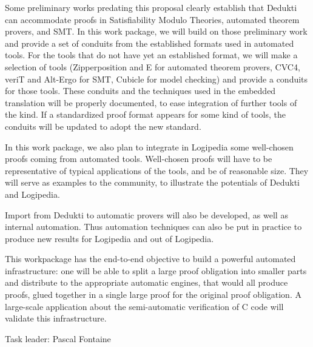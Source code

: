 \begin{workpackage}
\begin{wpdescription}
Some preliminary works predating this proposal clearly establish that
Dedukti can accommodate proofs in Satisfiability Modulo Theories,
automated theorem provers, and SMT.  In this work package, we will
build on those preliminary work and provide a set of conduits from the
established formats used in automated tools. For the tools that do not
have yet an established format, we will make a selection of tools
(Zipperposition and E for automated theorem provers, CVC4, veriT and Alt-Ergo
for SMT, Cubicle for model checking) and provide a conduits for those
tools.  These conduits and the techniques used in the embedded
translation will be properly documented, to ease integration of
further tools of the kind.  If a standardized proof format appears for
some kind of tools, the conduits will be updated to adopt the new
standard.

In this work package, we also plan to integrate in Logipedia some
well-chosen proofs coming from automated tools.  Well-chosen proofs
will have to be representative of typical applications of the tools,
and be of reasonable size.  They will serve as examples to the
community, to illustrate the potentials of Dedukti and Logipedia.

Import from Dedukti to automatic provers will also be developed, as well
as internal automation. Thus automation techniques can also be put in
practice to produce new results for Logipedia and out of Logipedia.

This workpackage has the end-to-end objective to build a powerful
automated infrastructure: one will be able to split a large proof
obligation into smaller parts and distribute to the appropriate
automatic engines, that would all produce proofs, glued together in a
single large proof for the original proof obligation. A large-scale
application about the semi-automatic verification of C code will
validate this infrastructure.
\end{wpdescription}


\begin{tasklist}
\begin{task}[id=instrumenting, title=Instrumenting ATPs to produce
  traces]
  Task leader: Pascal Fontaine
  

\end{task}
\end{tasklist}
\end{workpackage}
